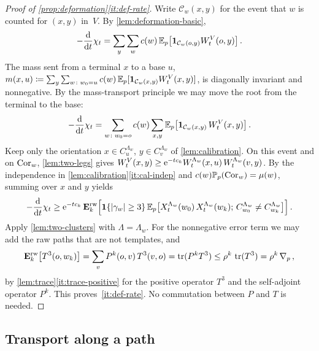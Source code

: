 \begin{proof}[Proof of \cref{prop:deformation}\ref{it:def-rate}]
Write $\mathcal C_w(x,y)$ for the event that $w$ is counted for $(x,y)$ in~$V$. By
\cref{lem:deformation-basic},
\begin{equation*}
  -\frac{\d}{\d t}\chi_t=\sum_y\sum_wc(w)\,\EE_p\bigl[\1_{\mathcal C_w(o,y)}W^V_t(o,y)\bigr]\,.
\end{equation*}
The mass sent from a terminal $x$ to a base $u$,
$m(x,u)\coloneqq\sum_y\sum_{w\colon w_0=u}c(w)\,\mathbb E_p[\mathbf{1}_{\mathcal C_w(x,y)}W^V_t(x,y)]$, is diagonally
invariant and nonnegative. By the mass-transport principle we may move the root from the terminal to the
base:
\begin{equation*}
  -\frac{\d}{\d t}\chi_t=\sum_{w\colon w_0=o}c(w)\sum_{x,y}\EE_p\bigl[\1_{\mathcal C_w(x,y)}\,W^V_t(x,y)\bigr]\,.
\end{equation*}
Keep only the orientation $x\in C_u^{\Lambda_w}$, $y\in C_v^{\Lambda_w}$ of \cref{lem:calibration}. On
this event and on $\mathrm{Cor}_w$, \cref{lem:two-legs} gives
$W^V_t(x,y)\ge\mathrm{e}^{-tc_k}W^{\Lambda_w}_t(x,u)\,W^{\Lambda_w}_t(v,y)$. By the independence in
\cref{lem:calibration}\ref{it:cal-indep} and $c(w)\mathbb P_p(\mathrm{Cor}_w)=\mu(w)$, summing over $x$ and $y$
yields
\begin{equation*}
  -\frac{\d}{\d t}\chi_t\ge\e^{-tc_k}\,\Erw\Bigl[\1\{\abs{\gamma_w}\ge3\}\,\EE_p\bigl[X^{\Lambda_w}_t(w_0)\,
  X^{\Lambda_w}_t(w_k);\,C^{\Lambda_w}_{w_0}\neq C^{\Lambda_w}_{w_k}\bigr]\Bigr]\,.
\end{equation*}
Apply \cref{lem:two-clusters} with $\Lambda=\Lambda_w$. For the nonnegative error term we may add the
raw paths that are not templates, and
\begin{equation*}
  \mathbf{E}^{\mathrm{rw}}_{k}\bigl[T^3(o,w_k)\bigr]=\sum_vP^k(o,v)\,T^3(v,o)=\operatorname{tr}(P^kT^3)\le\rho^k\,\operatorname{tr}(T^3)=\rho^k\,\nabla_p\,,
\end{equation*}
by \cref{lem:trace}\ref{it:trace-positive} for the positive operator $T^3$ and the self-adjoint
operator $P^k$. This proves~\ref{it:def-rate}. No commutation between $P$ and $T$ is needed.
\end{proof}

\subsection{Transport along a path}\label{sec:transport}

